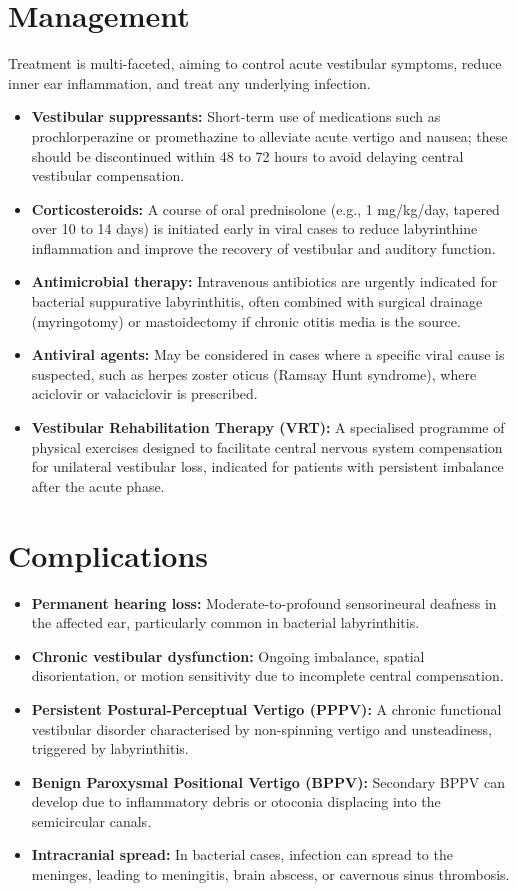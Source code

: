 \section*{Management}
Treatment is multi-faceted, aiming to control acute vestibular symptoms, reduce inner ear inflammation, and treat any underlying infection.
\begin{itemize}
    \item \textbf{Vestibular suppressants:} Short-term use of medications such as prochlorperazine or promethazine to alleviate acute vertigo and nausea; these should be discontinued within 48 to 72 hours to avoid delaying central vestibular compensation.
    \item \textbf{Corticosteroids:} A course of oral prednisolone (e.g., 1 mg/kg/day, tapered over 10 to 14 days) is initiated early in viral cases to reduce labyrinthine inflammation and improve the recovery of vestibular and auditory function.
    \item \textbf{Antimicrobial therapy:} Intravenous antibiotics are urgently indicated for bacterial suppurative labyrinthitis, often combined with surgical drainage (myringotomy) or mastoidectomy if chronic otitis media is the source.
    \item \textbf{Antiviral agents:} May be considered in cases where a specific viral cause is suspected, such as herpes zoster oticus (Ramsay Hunt syndrome), where aciclovir or valaciclovir is prescribed.
    \item \textbf{Vestibular Rehabilitation Therapy (VRT):} A specialised programme of physical exercises designed to facilitate central nervous system compensation for unilateral vestibular loss, indicated for patients with persistent imbalance after the acute phase.
\end{itemize}

\section*{Complications}
\begin{itemize}
    \item \textbf{Permanent hearing loss:} Moderate-to-profound sensorineural deafness in the affected ear, particularly common in bacterial labyrinthitis.
    \item \textbf{Chronic vestibular dysfunction:} Ongoing imbalance, spatial disorientation, or motion sensitivity due to incomplete central compensation.
    \item \textbf{Persistent Postural-Perceptual Vertigo (PPPV):} A chronic functional vestibular disorder characterised by non-spinning vertigo and unsteadiness, triggered by labyrinthitis.
    \item \textbf{Benign Paroxysmal Positional Vertigo (BPPV):} Secondary BPPV can develop due to inflammatory debris or otoconia displacing into the semicircular canals.
    \item \textbf{Intracranial spread:} In bacterial cases, infection can spread to the meninges, leading to meningitis, brain abscess, or cavernous sinus thrombosis.
\end{itemize}

